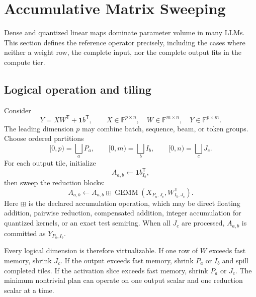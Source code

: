 \section{Accumulative Matrix Sweeping}
\label{sec:linear}

Dense and quantized linear maps dominate parameter volume in many LLMs. This section defines the reference \AMS operator precisely, including the cases where neither a weight row, the complete input, nor the complete output fits in the compute tier.

\subsection{Logical operation and tiling}

Consider
\[
  Y=XW^{\mathsf T}+\mathbf 1b^{\mathsf T},
  \qquad
  X\in\mathbb F^{p\times n},\quad
  W\in\mathbb F^{m\times n},\quad
  Y\in\mathbb F^{p\times m}.
\]
The leading dimension $p$ may combine batch, sequence, beam, or token groups. Choose ordered partitions
\[
  [0,p)=\bigsqcup_a P_a,
  \qquad [0,m)=\bigsqcup_b I_b,
  \qquad [0,n)=\bigsqcup_c J_c.
\]
For each output tile, initialize
\[
  A_{a,b}\leftarrow \mathbf 1 b_{I_b}^{\mathsf T},
\]
then sweep the reduction blocks:
\begin{equation}
\label{eq:ams-update}
  A_{a,b}\leftarrow A_{a,b}\boxplus
  \operatorname{GEMM}\!
  \left(X_{P_a,J_c},W_{I_b,J_c}^{\mathsf T}\right).
\end{equation}
Here $\boxplus$ is the declared accumulation operation, which may be direct floating addition, pairwise reduction, compensated addition, integer accumulation for quantized kernels, or an exact test semiring. When all $J_c$ are processed, $A_{a,b}$ is committed as $Y_{P_a,I_b}$.

Every logical dimension is therefore virtualizable. If one row of $W$ exceeds fast memory, shrink $J_c$. If the output exceeds fast memory, shrink $P_a$ or $I_b$ and spill completed tiles. If the activation slice exceeds fast memory, shrink $P_a$ or $J_c$. The minimum nontrivial plan can operate on one output scalar and one reduction scalar at a time.

